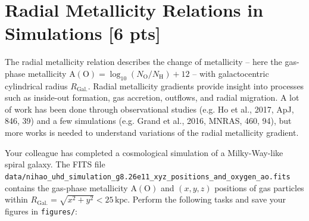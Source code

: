 \documentclass[a4paper,12pt]{article}
\begin{document}
\section{Radial Metallicity Relations in Simulations \hfill [6 pts]}

The radial metallicity relation describes the change of metallicity -- here the gas-phase metallicity $\mathrm{A(O)}=\log_{10}(N_\mathrm{O}/N_\mathrm{H})+12$ -- with galactocentric cylindrical radius $R_\mathrm{Gal.}$. Radial metallicity gradients provide insight into processes such as inside-out formation, gas accretion, outflows, and radial migration. A lot of work has been done through observational studies (e.g. Ho et al., 2017, ApJ, 846, 39) and a few simulations (e.g. Grand et al., 2016, MNRAS, 460, 94), but more works is needed to understand variations of the radial metallicity gradient.

Your colleague has completed a cosmological simulation of a Milky-Way-like spiral galaxy. The FITS file \texttt{data/nihao\_uhd\_simulation\_g8.26e11\_xyz\_positions\_and\_oxygen\_ao.fits} contains the gas-phase metallicity $\mathrm{A(O)}$ and $(x,y,z)$ positions of gas particles within $R_\mathrm{Gal.} = \sqrt{x^2 + y^2} <25\,\mathrm{kpc}$.
Perform the following tasks and save your figures in \texttt{figures/}:
\end{document}
